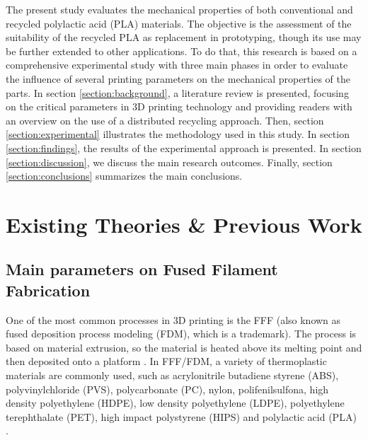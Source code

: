 \documentclass[]{interact}
\theoremstyle{plain}%
\theoremstyle{definition}
\theoremstyle{remark}
\begin{document}
The present study evaluates the mechanical properties of both
conventional and recycled polylactic acid (PLA) materials. The objective
is the assessment of the suitability of the recycled PLA as replacement
in prototyping, though its use may be further extended to other
applications. To do that, this research is based on a comprehensive
experimental study with three main phases in order to evaluate the
influence of several printing parameters on the mechanical properties of
the parts. In section \ref{section:background}, a literature review is
presented, focusing on the critical parameters in 3D printing technology
and providing readers with an overview on the use of a distributed
recycling approach. Then, section \ref{section:experimental} illustrates
the methodology used in this study. In section \ref{section:findings},
the results of the experimental approach is presented. In section
\ref{section:discussion}, we discuss the main research outcomes.
Finally, section \ref{section:conclusions} summarizes the main
conclusions.

\hypertarget{existing-theories-previous-work}{%
\section{Existing Theories \& Previous
Work}\label{existing-theories-previous-work}}

\label{section:background}

\hypertarget{main-parameters-on-fused-filament-fabrication}{%
\subsection{Main parameters on Fused Filament
Fabrication}\label{main-parameters-on-fused-filament-fabrication}}

One of the most common processes in 3D printing is the FFF (also known
as fused deposition process modeling (FDM), which is a trademark). The
process is based on material extrusion, so the material is heated above
its melting point and then deposited onto a platform
\citep{Wolszczak2018}. In FFF/FDM, a variety of thermoplastic materials
are commonly used, such as acrylonitrile butadiene styrene (ABS),
polyvinylchloride (PVS), polycarbonate (PC), nylon, polifenilsulfona,
high density polyethylene (HDPE), low density polyethylene (LDPE),
polyethylene terephthalate (PET), high impact polystyrene (HIPS) and
polylactic acid (PLA) \citep{Chua2017, Zhao2018a, Singh2018e}.
\end{document}
